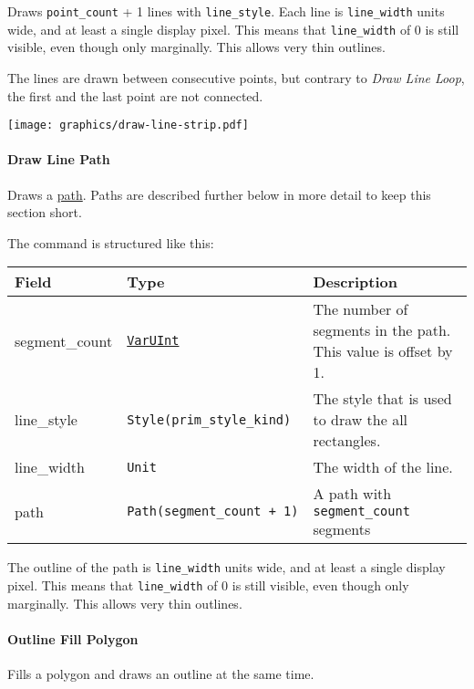 \documentclass[]{article}
\begin{document}
Draws \texttt{point\_count} + 1 lines with \texttt{line\_style}. Each
line is \texttt{line\_width} units wide, and at least a single display
pixel. This means that \texttt{line\_width} of 0 is still visible, even
though only marginally. This allows very thin outlines.

The lines are drawn between consecutive points, but contrary to \emph{Draw Line Loop}, the first and the last point are not connected.

\begin{center}
\texttt{[image: graphics/draw-line-strip.pdf]}
\end{center}

\hypertarget{draw-line-path}{\paragraph{Draw Line Path}\label{draw-line-path}}

Draws a \protect\hyperlink{path}{path}. Paths are described further
below in more detail to keep this section short.

The command is structured like this:

\begin{longtable}[]{@{}p{1in}p{2in}p{3in}@{}}
\toprule
Field & Type & Description \\
\midrule
\endhead
segment\_count & \protect\hyperlink{varuint}{\texttt{VarUInt}} & The
number of segments in the path. This value is offset by 1. \\
line\_style & \texttt{Style(prim\_style\_kind)} & The style that is
used to draw the all rectangles. \\
line\_width & \texttt{Unit} & The width of the line. \\
path & \texttt{Path(segment\_count\ +\ 1)} & A path with
\texttt{segment\_count} segments \\
\bottomrule
\end{longtable}

The outline of the path is \texttt{line\_width} units wide, and at least
a single display pixel. This means that \texttt{line\_width} of 0 is
still visible, even though only marginally. This allows very thin
outlines.

\hypertarget{outline-fill-polygon}{\paragraph{Outline Fill Polygon}\label{outline-fill-polygon}}

Fills a polygon and draws an outline at the same time.
\end{document}
